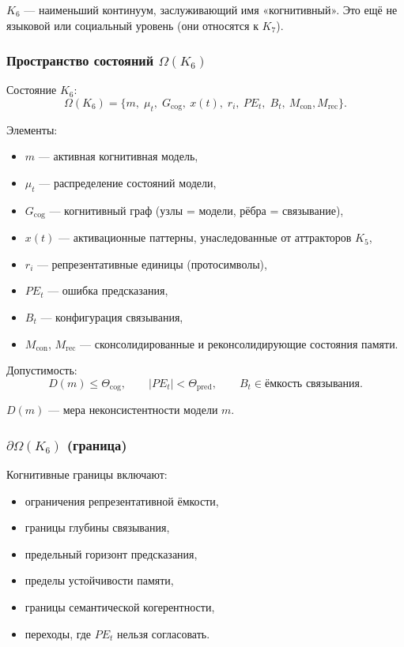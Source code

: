 $K_6$ — наименьший континуум, заслуживающий имя «когнитивный». Это ещё
не языковой или социальный уровень (они относятся к $K_7$).

\subsubsection{Пространство состояний \texorpdfstring{$\Omega(K_6)$}{\Omega(K_6)}}

Состояние $K_6$:
\[
\Omega(K_6) =
\{
m,\; \mu_t,\; G_{\mathrm{cog}},\
x(t),\; r_i,\
PE_t,\; B_t,\
M_{\mathrm{con}}, M_{\mathrm{rec}}
\}.
\]

Элементы:
\begin{itemize}
    \item $m$ — активная когнитивная модель,
    \item $\mu_t$ — распределение состояний модели,
    \item $G_{\mathrm{cog}}$ — когнитивный граф (узлы = модели, рёбра = связывание),
    \item $x(t)$ — активационные паттерны, унаследованные от аттракторов $K_5$,
    \item $r_i$ — репрезентативные единицы (протосимволы),
    \item $PE_t$ — ошибка предсказания,
    \item $B_t$ — конфигурация связывания,
    \item $M_{\mathrm{con}}$, $M_{\mathrm{rec}}$ — сконсолидированные и
          реконсолидирующие состояния памяти.
\end{itemize}

Допустимость:
\[
D(m) \le \Theta_{\mathrm{cog}}, \qquad
|PE_t| < \Theta_{\mathrm{pred}}, \qquad
B_t \in \text{ёмкость связывания}.
\]

$D(m)$ — мера неконсистентности модели $m$.

\subsubsection{\texorpdfstring{$\partial\Omega(K_6)$}{\partial\Omega(K_6)} (граница)}

Когнитивные границы включают:
\begin{itemize}
    \item ограничения репрезентативной ёмкости,
    \item границы глубины связывания,
    \item предельный горизонт предсказания,
    \item пределы устойчивости памяти,
    \item границы семантической когерентности,
    \item переходы, где $PE_t$ нельзя согласовать.
\end{itemize}

